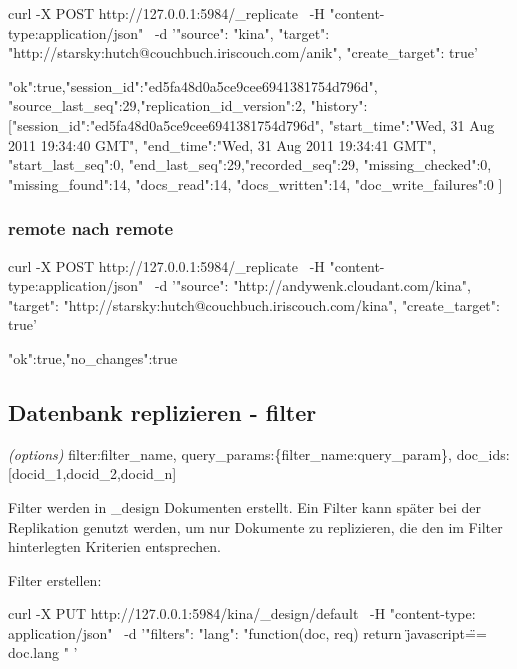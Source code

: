 \documentclass[19pt,landscape,twocolumn]{article}
\newcommand{\brackets}[1]{{[}{#1}{]}}
\newcommand{\setparskip}{\setlength{\parskip}{-6mm}}
\newcommand{\resetparskip}{\setlength{\parskip}{1mm}}
\begin{document}
\begin{code}
curl -X POST http://127.0.0.1:5984/_replicate \
     -H "content-type:application/json" \
     -d '{"source": "kina",
          "target": "http://starsky:hutch@couchbuch.iriscouch.com/anik",
          "create_target": true}'
\end{code}
\setparskip
\begin{response}
{"ok":true,"session_id":"ed5fa48d0a5ce9cee6941381754d796d",
  "source_last_seq":29,"replication_id_version":2,
  "history":
    [{"session_id":"ed5fa48d0a5ce9cee6941381754d796d",
      "start_time":"Wed, 31 Aug 2011 19:34:40 GMT",
      "end_time":"Wed, 31 Aug 2011 19:34:41 GMT",
      "start_last_seq":0,
      "end_last_seq":29,"recorded_seq":29,
      "missing_checked":0,
      "missing_found":14,
      "docs_read":14,
      "docs_written":14,
      "doc_write_failures":0
  }]
}
\end{response}
\resetparskip

\subsubsection{remote nach remote}
\begin{code}
curl -X POST http://127.0.0.1:5984/_replicate \
     -H "content-type:application/json" \
     -d '{"source": "http://andywenk.cloudant.com/kina",
          "target": "http://starsky:hutch@couchbuch.iriscouch.com/kina",
          "create_target": true}'
\end{code}
\setparskip
\begin{response}
{"ok":true,"no_changes":true}
\end{response}
\resetparskip

\subsection{Datenbank replizieren - filter}
\emph{(options)} filter:filter\_name, query\_params:\{filter\_name:query\_param\},\newline
doc\_ids: \brackets{docid\_1,docid\_2,docid\_n} \newline

Filter werden in \_design Dokumenten erstellt. Ein Filter kann später bei der Replikation genutzt werden, um nur
Dokumente zu replizieren, die den im Filter hinterlegten Kriterien entsprechen.

Filter erstellen:

\begin{code}
curl -X PUT http://127.0.0.1:5984/kina/_design/default \
  -H "content-type: application/json" \
  -d '{"filters":{
        "lang":
          "function(doc, req) {
            return \"javascript\" == doc.lang 
          }"
        }
     }'
\end{code}
\end{document}
